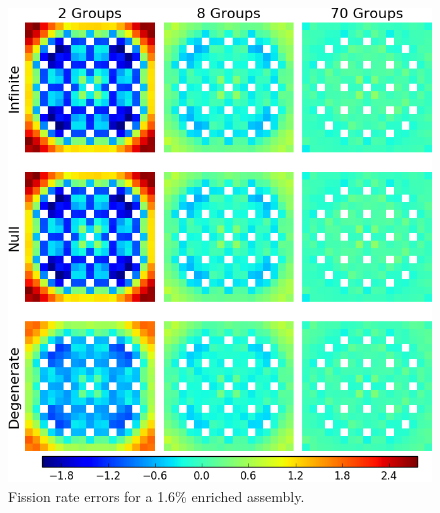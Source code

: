 \begin{figure}[h!]
\centering
\includegraphics[width=\linewidth]{figures/quantification/assm-16/fiss-err}
\caption[Fission rate errors for a 1.6\% enriched assembly]{Fission rate errors for a 1.6\% enriched assembly.}
\label{fig:chap8-assm-1.6-fiss-err}
\end{figure}


